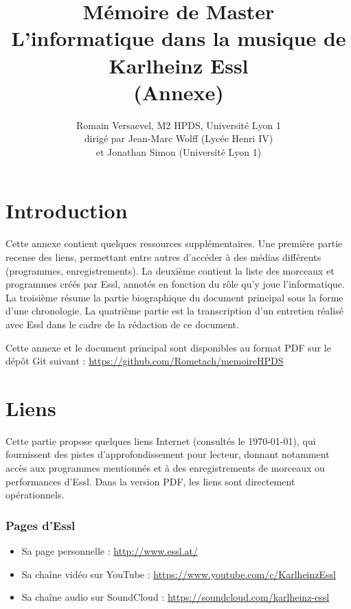 \documentclass[a4paper,12pt]{article}
\title{\Large Mémoire de Master \\ \LARGE L'informatique dans la musique de Karlheinz Essl\\
(Annexe)}
\author{\normalsize Romain Versaevel, M2 HPDS, Université Lyon 1\\
\normalsize dirigé par Jean-Marc Wolff (Lycée Henri IV) \\
\normalsize et Jonathan Simon (Université Lyon 1)}
\begin{document}
\maketitle
\newpage

\tableofcontents

\newpage
\section{Introduction}

Cette annexe contient quelques ressources supplémentaires. Une première partie recense des liens, permettant entre autres d'accéder à des médias différents (programmes, enregistrements). La deuxième contient la liste des morceaux et programmes créés par Essl, annotés en fonction du rôle qu'y joue l'informatique. La troisième résume la partie biographique du document principal sous la forme d'une chronologie. La quatrième partie est la transcription d'un entretien réalisé avec Essl dans le cadre de la rédaction de ce document.

Cette annexe et le document principal sont disponibles au format PDF sur le dépôt Git suivant :
\href{https://github.com/Rometach/memoireHPDS}{https://github.com/Rometach/memoireHPDS}

\newpage
\section{Liens}

Cette partie propose quelques liens Internet (consultés le \today), qui fournissent des pistes d'approfondissement pour lecteur, donnant notamment accès aux programmes mentionnés et à des enregistrements de morceaux ou performances d'Essl. Dans la version PDF, les liens sont directement opérationnels.

\subsubsection*{Pages d'Essl}

\begin{itemize}
\item Sa page personnelle : \href{http://www.essl.at/}{http://www.essl.at/}
\item Sa chaîne vidéo sur YouTube : \href{https://www.youtube.com/c/KarlheinzEssl}{https://www.youtube.com/c/KarlheinzEssl}
\item Sa chaîne audio sur SoundCloud : \href{https://soundcloud.com/karlheinz-essl}{https://soundcloud.com/karlheinz-essl}
\end{itemize}
\end{document}
